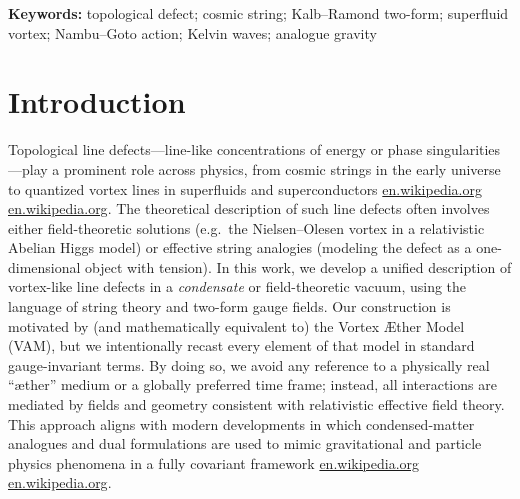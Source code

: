 \documentclass[12pt]{article}
\begin{document}
\noindent\textbf{Keywords:} topological defect; cosmic string; Kalb--Ramond two-form; superfluid vortex; Nambu--Goto action; Kelvin waves; analogue gravity

\section*{Introduction}

Topological line defects---line-like concentrations of energy or phase singularities---play a prominent role across physics, from cosmic strings in the early universe to quantized vortex lines in superfluids and superconductors%
\href{https://en.wikipedia.org/wiki/Vortex_ring#:~:text=The%20resulting%20circulation%20Image%3A%20,frac%20%7B7%7D%7B4%7D%7D%5Cright%29%5Cend%7Baligned}{en.wikipedia.org}%
\href{https://en.wikipedia.org/wiki/Vortex_ring#:~:text=,frac%20%7B1%7D%7B4%7D%7D%5Cright}{en.wikipedia.org}.
The theoretical description of such line defects often involves either field-theoretic solutions (e.g.\ the Nielsen--Olesen vortex in a relativistic Abelian Higgs model) or effective string analogies (modeling the defect as a one-dimensional object with tension). In this work, we develop a unified description of vortex-like line defects in a \emph{condensate} or field-theoretic vacuum, using the language of string theory and two-form gauge fields. Our construction is motivated by (and mathematically equivalent to) the Vortex Æther Model (VAM), but we intentionally recast every element of that model in standard gauge-invariant terms. By doing so, we avoid any reference to a physically real ``æther'' medium or a globally preferred time frame; instead, all interactions are mediated by fields and geometry consistent with relativistic effective field theory. This approach aligns with modern developments in which condensed-matter analogues and dual formulations are used to mimic gravitational and particle physics phenomena in a fully covariant framework%
\href{https://en.wikipedia.org/wiki/Vortex_ring#:~:text=50.%20,On%20a%20spherical%20vortex}{en.wikipedia.org}%
\href{https://en.wikipedia.org/wiki/Vortex_ring#:~:text=pp.%C2%A01%E2%80%9310.%20doi%3A10.1007%2F978,On%20a%20spherical%20vortex}{en.wikipedia.org}.
\end{document}
